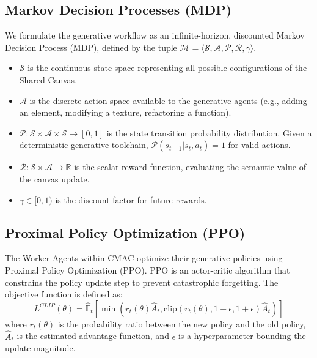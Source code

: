 \documentclass[pdflatex,sn-mathphys-num]{sn-jnl}
\begin{document}
\subsection{Markov Decision Processes (MDP)}
We formulate the generative workflow as an infinite-horizon, discounted Markov Decision Process (MDP), defined by the tuple $\mathcal{M} = \langle \mathcal{S}, \mathcal{A}, \mathcal{P}, \mathcal{R}, \gamma \rangle$.
\begin{itemize}
    \item $\mathcal{S}$ is the continuous state space representing all possible configurations of the Shared Canvas.
    \item $\mathcal{A}$ is the discrete action space available to the generative agents (e.g., adding an element, modifying a texture, refactoring a function).
    \item $\mathcal{P}: \mathcal{S} \times \mathcal{A} \times \mathcal{S} \rightarrow [0,1]$ is the state transition probability distribution. Given a deterministic generative toolchain, $\mathcal{P}(s_{t+1} | s_t, a_t) = 1$ for valid actions.
    \item $\mathcal{R}: \mathcal{S} \times \mathcal{A} \rightarrow \mathbb{R}$ is the scalar reward function, evaluating the semantic value of the canvas update.
    \item $\gamma \in [0, 1)$ is the discount factor for future rewards.
\end{itemize}

\subsection{Proximal Policy Optimization (PPO)}
The Worker Agents within CMAC optimize their generative policies using Proximal Policy Optimization (PPO). PPO is an actor-critic algorithm that constrains the policy update step to prevent catastrophic forgetting. The objective function is defined as:
\begin{equation}
L^{CLIP}(\theta) = \hat{\mathbb{E}}_t \left[ \min(r_t(\theta)\hat{A}_t, \text{clip}(r_t(\theta), 1-\epsilon, 1+\epsilon)\hat{A}_t) \right]
\end{equation}
where $r_t(\theta)$ is the probability ratio between the new policy and the old policy, $\hat{A}_t$ is the estimated advantage function, and $\epsilon$ is a hyperparameter bounding the update magnitude.
\end{document}
